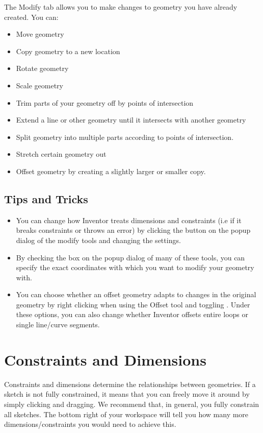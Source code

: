 \cbstart
{}
The Modify tab allows you to make changes to geometry you have already created. You can:

\begin{itemize}
\item Move geometry
\item Copy geometry to a new location
\item Rotate geometry
\item Scale geometry
\item Trim parts of your geometry off by points of intersection
\item Extend a line or other geometry until it intersects with another geometry
\item Split geometry into multiple parts according to points of intersection.
\item Stretch certain geometry out
\item Offset geometry by creating a slightly larger or smaller copy.
\end{itemize}
\cbend

\subsection{Tips and Tricks}
\cbstart
{}
\begin{itemize}
\item You can change how Inventor treats dimensions and constraints (i.e if it breaks constraints or throws an error) by clicking the \appcommand{\(\gg\)} button on the popup dialog of the modify tools and changing the settings.
\item By checking the  box on the popup dialog of many of these tools, you can specify the exact coordinates with which you want to modify your geometry with.
\item You can choose whether an offset geometry adapts to changes in the original geometry by right clicking when using the Offset tool and toggling . Under these options, you can also change whether Inventor offsets entire loops or single line/curve segments.
\end{itemize}
\cbend

\section{Constraints and Dimensions}
\label{chap:constraints}

\cbstart
{}
Constraints and dimensions determine the relationships between geometries. If a sketch is not fully constrained, it means that you can freely move it around by simply clicking and dragging. We recommend that, in general, you fully constrain all sketches. The bottom right of your workspace will tell you how many more dimensions/constraints you would need to achieve this.


